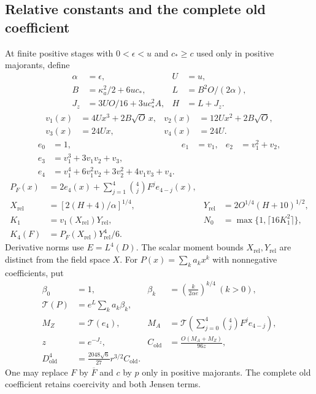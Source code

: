 \documentclass[11pt]{article}
\theoremstyle{plain}
\theoremstyle{definition}
\theoremstyle{remark}
\begin{document}
\subsection{Relative constants and the complete old coefficient}
At finite positive stages with $0<\epsilon<u$ and $c_*\ge c$ used only
in positive majorants, define
\begin{align*}
 \alpha&=\epsilon,& U&=u,\\
 B&=\kappa_a^2/2+6uc_*,&L&=B^2O/(2\alpha),\\
 J_z&=3UO/16+3uc_*^2 A,&H&=L+J_z.
\end{align*}
\begin{align*}
 v_1(x)&=4Ux^3+2B\sqrt O\,x,&v_2(x)&=12Ux^2+2B\sqrt O,\\
 v_3(x)&=24Ux,&v_4(x)&=24U.
\end{align*}
\begin{align*}
 e_0&=1,&e_1&=v_1,&e_2&=v_1^2+v_2,\\
 e_3&=v_1^3+3v_1v_2+v_3,\\
 e_4&=v_1^4+6v_1^2v_2+3v_2^2+4v_1v_3+v_4.
\end{align*}
\begin{align*}
 P_F(x)&=2e_4(x)+\sum_{j=1}^4\binom4j F^j e_{4-j}(x),\\
 X_{\mathrm{rel}}&=[2(H+4)/\alpha]^{1/4},&
 Y_{\mathrm{rel}}&=2O^{1/4}(H+10)^{1/2},\\
 K_1&=v_1(X_{\mathrm{rel}})Y_{\mathrm{rel}},&
 N_0&=\max\{1,\lceil16K_1^2\rceil\},\\
 K_4(F)&=P_F(X_{\mathrm{rel}})Y_{\mathrm{rel}}^4/6.
\end{align*}
Derivative norms use $E=L^4(D)$. The scalar moment bounds
$X_{\mathrm{rel}},Y_{\mathrm{rel}}$ are distinct from the field space $X$.
For $P(x)=\sum_k a_kx^k$ with nonnegative coefficients, put
\begin{align*}
 \beta_0&=1,&\beta_k&=\left(\frac{k}{2\alpha e}\right)^{k/4}\ (k>0),\\
 \mathcal T(P)&=e^L\sum_k a_k\beta_k,\\
 M_Z&=\mathcal T(e_4),&
 M_A&=\mathcal T\left(\sum_{j=0}^4\binom4jF^je_{4-j}\right),\\
 z&=e^{-J_z},&C_{\mathrm{old}}&=\frac{O(M_A+M_Z)}{96z},\\
 D_{\mathrm{old}}^4&=\frac{2048\sqrt6}{27}r^{3/2}C_{\mathrm{old}}.
\end{align*}
One may replace $F$ by $\overline F$ and $c$ by $p$ only in positive
majorants. The complete old coefficient retains coercivity and both Jensen terms.
\end{document}

